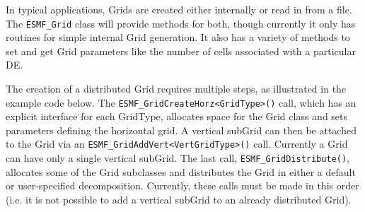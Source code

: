 


In typical applications, Grids are created either internally or read in from
a file.  The {\tt ESMF\_Grid} class will provide methods for both, though 
currently it only has routines for simple internal Grid generation.  It also
has a variety of methods to set and get Grid parameters like the number of cells
associated with a particular DE.  

The creation of a distributed Grid requires multiple steps, as
illustrated in the example code below.  The {\tt ESMF\_GridCreateHorz<GridType>()} call, which has an
explicit interface for each GridType, allocates space for the Grid class and sets
parameters defining the horizontal grid.  A vertical subGrid can then be attached
to the Grid via an {\tt ESMF\_GridAddVert<VertGridType>()} call.  Currently a Grid can have only a single
vertical subGrid.  The last call, {\tt ESMF\_GridDistribute()}, allocates some of
the Grid subclasses and distributes the Grid in either a default or
user-specified decomposition.  Currently, these calls must be made in this order
(i.e. it is not possible to add a vertical subGrid to an already distributed
Grid).

